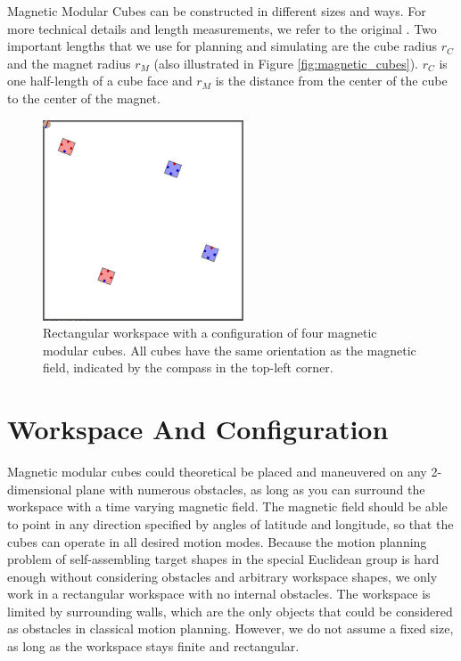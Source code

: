 Magnetic Modular Cubes can be constructed in different sizes and ways. For more technical details and length measurements, we refer to the original \cite{Bhattacharjee2022}.
Two important lengths that we use for planning and simulating are the cube radius $r_C$ and the magnet radius $r_M$ (also illustrated in Figure \ref{fig:magnetic_cubes}).
$r_C$ is one half-length of a cube face and $r_M$ is the distance from the center of the cube to the center of the magnet.

\begin{figure}
	\centering
	\includegraphics[width=0.53\textwidth]{figures/workspace_config.png}
	\caption{Rectangular workspace with a configuration of four magnetic modular cubes. All cubes have the same orientation as the magnetic field, indicated by the compass in the top-left corner.}
	\label{fig:workspace_config}
\end{figure}

\section{Workspace And Configuration}
Magnetic modular cubes could theoretical be placed and maneuvered on any 2-dimensional plane with numerous obstacles, as long as you can surround the workspace with a time varying magnetic field.
The magnetic field should be able to point in any direction specified by angles of latitude and longitude, so that the cubes can operate in all desired motion modes.
Because the motion planning problem of self-assembling target shapes in the special Euclidean group is hard enough without considering obstacles and arbitrary workspace shapes, we only work in a rectangular workspace with no internal obstacles.
The workspace is limited by surrounding walls, which are the only objects that could be considered as obstacles in classical motion planning.
However, we do not assume a fixed size, as long as the workspace stays finite and rectangular.

